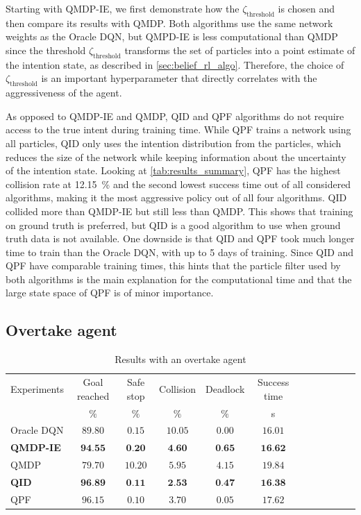 Starting with QMDP-IE, we first demonstrate how the $\zeta_\text{threshold}$ is chosen and then compare its results with QMDP. Both algorithms use the same network weights as the Oracle DQN, but QMPD-IE is less computational than QMDP since the threshold $\zeta_\text{threshold}$ transforms the set of particles into a point estimate of the intention state, as described in \ref{sec:belief_rl_algo}. Therefore, the choice of $\zeta_\text{threshold}$ is an important hyperparameter that directly correlates with the aggressiveness of the agent.

As opposed to QMDP-IE and QMDP, QID and QPF algorithms do not require access to the true intent during training time. While QPF trains a network using all particles, QID only uses the intention distribution from the particles, which reduces the size of the network while keeping information about the uncertainty of the intention state. 
Looking at \ref{tab:results_summary}, QPF has the highest collision rate at \SI{12.15}{\percent} and the second lowest success time out of all considered algorithms, making it the most aggressive policy out of all four algorithms. 
QID collided more than QMDP-IE but still less than QMDP. This shows that training on ground truth is preferred, but QID is a good algorithm to use when ground truth data is not available. 
One downside is that QID and QPF took much longer time to train than the Oracle DQN, with up to 5 days of training. Since QID and QPF have comparable training times, this hints that the particle filter used by both algorithms is the main explanation for the computational time and that the large state space of QPF is of minor importance.

\subsection{Overtake agent}
\begin{table}
\caption{Results with an overtake agent}
\label{tab:results_overtake}
\begin{tabularx}{\columnwidth}{@{}l*{10}{c}c@{}}
\toprule
Experiments & Goal reached & Safe stop & Collision & Deadlock & Success time \\ 
     & $\%$ & $\%$ & $\%$ & $\%$ & s \\ 
\midrule
Oracle DQN & $89.80$ & $0.15$ & $10.05$ & $0.00$ & $16.01$ \\ 
\textbf{QMDP-IE} & $\textbf{94.55}$ & $\textbf{0.20}$ & $\textbf{4.60}$ & $\textbf{0.65}$ & $\textbf{16.62}$ \\ 
QMDP & $79.70$ & $10.20$ & $5.95$ & $4.15$ & $19.84$ \\ 
\textbf{QID} & $\textbf{96.89}$ & $\textbf{0.11}$ & $\textbf{2.53}$ & $\textbf{0.47}$ & $\textbf{16.38}$ \\ 
QPF & $96.15$ & $0.10$ & $3.70$ & $0.05$ & $17.62$ \\ 
\bottomrule
\end{tabularx}
\end{table}

